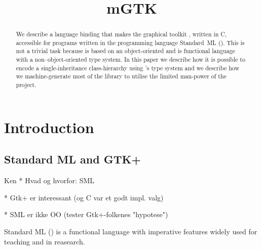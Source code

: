 \documentclass[workingdraft,endnotes]{usetex-v1}
\begin{document}
\title{mGTK}


\author{
\and
{}
%
} %

\maketitle

\begin{abstract}
  We describe \mgtk a language binding that makes the graphical
  toolkit \gtk, written in C, accessible for programs written in the
  programming language Standard~ML (\sml).  This is not a trivial task
  because \gtk is based on an object-oriented and \sml is functional
  language with a non--object-oriented type system.  In this paper we
  describe how it is possible to encode a single-inheritance
  class-hierarchy using \sml's type system and we describe how we
  machine-generate most of the library to utilise the limited
  man-power of the project.
\end{abstract}



\section{Introduction}
\label{sec:intr-backgr}



\subsection{Standard ML and GTK+}

\begin{ednote}{Ken}
  * Hvad og hvorfor: SML  
  
  * Gtk+ er interessant (og C var et godt
    impl. valg)  
  
  * SML er ikke OO (tester Gtk+-folkenes "hypotese")
\end{ednote}

Standard ML (\sml) is a functional language with imperative features
widely used for teaching and in reasearch. 
\end{document}
